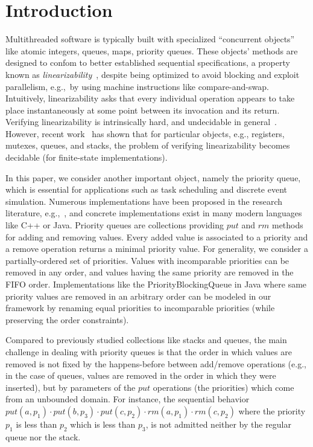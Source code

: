 \section{Introduction}
\label{sec:introduction}


Multithreaded software is typically built with specialized “concurrent
  objects” like atomic integers, queues, maps, priority queues. These objects’ methods are
  designed to confom to better established sequential specifications, a property known as \emph{linearizability}~\cite{journals/toplas/HerlihyW90},
  despite being optimized to avoid blocking and exploit parallelism, e.g.,~by
  using machine instructions like compare-and-swap. Intuitively, linearizability asks that every individual operation appears to take place instantaneously at some point between its invocation and its return. Verifying linearizability is intrinsically hard, and undecidable in general~\cite{conf/esop/BouajjaniEEH13}.
However, recent work~\cite{DBLP:conf/icalp/BouajjaniEEH15} has shown that for particular objects,
e.g., registers, mutexes, queues, and stacks, the problem of verifying linearizability becomes decidable (for finite-state implementations).

In this paper, we consider another important object, namely the priority queue, which is essential for applications such as task scheduling and discrete event simulation. Numerous implementations have been proposed in the research literature, e.g.,~\cite{DBLP:conf/ppopp/AlistarhKLS15,DBLP:conf/wdag/CalciuMH14,DBLP:conf/opodis/LindenJ13,DBLP:conf/podc/ShavitZ99,DBLP:conf/ipps/ShavitL00}, and concrete implementations exist in many modern languages like C++ or Java.
Priority queues are collections providing $\textit{put}$ and $\textit{rm}$ methods for adding and removing values. Every added value is associated to a priority and a remove operation returns a minimal priority value. For generality, we consider a partially-ordered set of priorities. Values with incomparable priorities can be removed in any order, and values having the same priority are removed in the FIFO order. Implementations like the PriorityBlockingQueue in Java where same priority values are removed in an arbitrary order can be modeled in our framework by renaming equal priorities to incomparable priorities (while preserving the order constraints).

Compared to previously studied collections like stacks and queues, the main challenge in dealing with priority queues is that the order in which values are removed is not fixed by the happens-before between add/remove operations (e.g., in the case of queues, values are removed in the order in which they were inserted), but by parameters of the $\textit{put}$ operations (the priorities) which come from an unbounded domain. For instance, the sequential behavior $\textit{put}(a,p_1)\cdot \textit{put}(b,p_3)\cdot \textit{put}(c,p_2)\cdot \textit{rm}(a,p_1)\cdot \textit{rm}(c,p_2)$ where the priority $p_1$ is less than $p_2$ which is less than $p_3$, is not admitted neither by the regular queue nor the stack.



